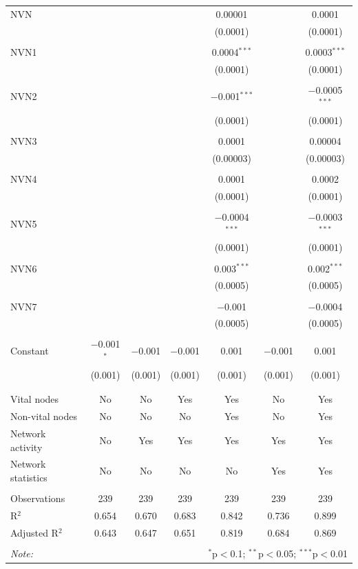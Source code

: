 \begin{table}[!htbp]
\begin{tabular}{@{\extracolsep{5pt}}lcccccc}
 NVN &  &  &  & 0.00001 &  & 0.0001 \\ 
  &  &  &  & (0.0001) &  & (0.0001) \\ 
  & & & & & & \\ 
 NVN1 &  &  &  & 0.0004$^{***}$ &  & 0.0003$^{***}$ \\ 
  &  &  &  & (0.0001) &  & (0.0001) \\ 
  & & & & & & \\ 
 NVN2 &  &  &  & $-$0.001$^{***}$ &  & $-$0.0005$^{***}$ \\ 
  &  &  &  & (0.0001) &  & (0.0001) \\ 
  & & & & & & \\ 
 NVN3 &  &  &  & 0.0001 &  & 0.00004 \\ 
  &  &  &  & (0.00003) &  & (0.00003) \\ 
  & & & & & & \\ 
 NVN4 &  &  &  & 0.0001 &  & 0.0002 \\ 
  &  &  &  & (0.0001) &  & (0.0001) \\ 
  & & & & & & \\ 
 NVN5 &  &  &  & $-$0.0004$^{***}$ &  & $-$0.0003$^{***}$ \\ 
  &  &  &  & (0.0001) &  & (0.0001) \\ 
  & & & & & & \\ 
 NVN6 &  &  &  & 0.003$^{***}$ &  & 0.002$^{***}$ \\ 
  &  &  &  & (0.0005) &  & (0.0005) \\ 
  & & & & & & \\ 
 NVN7 &  &  &  & $-$0.001 &  & $-$0.0004 \\ 
  &  &  &  & (0.0005) &  & (0.0005) \\ 
  & & & & & & \\ 
 Constant & $-$0.001$^{*}$ & $-$0.001 & $-$0.001 & 0.001 & $-$0.001 & 0.001 \\ 
  & (0.001) & (0.001) & (0.001) & (0.001) & (0.001) & (0.001) \\ 
  & & & & & & \\ 
\hline \\[-1.8ex] 
Vital nodes & No & No & Yes & Yes & No & Yes \\ 
Non-vital nodes & No & No & No & Yes & No & Yes \\ 
Network activity & No & Yes & Yes & Yes & Yes & Yes \\ 
Network statistics & No & No & No & No & Yes & Yes \\ 
\hline &  &  &  &  &  &  \\ 
Observations & 239 & 239 & 239 & 239 & 239 & 239 \\ 
R$^{2}$ & 0.654 & 0.670 & 0.683 & 0.842 & 0.736 & 0.899 \\ 
Adjusted R$^{2}$ & 0.643 & 0.647 & 0.651 & 0.819 & 0.684 & 0.869 \\ 
\hline 
\hline \\[-1.8ex] 
\textit{Note:}  & \multicolumn{6}{r}{$^{*}$p$<$0.1; $^{**}$p$<$0.05; $^{***}$p$<$0.01} \\ 
\end{tabular} 
\end{table} 
